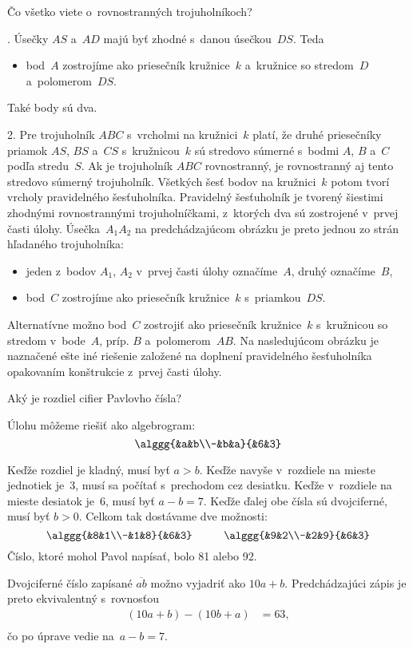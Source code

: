 {%
\napad
Čo všetko viete o~rovnostranných trojuholníkoch?

.
Úsečky $AS$ a~$AD$ majú byť zhodné s~danou úsečkou~$DS$.
Teda
\begin{itemize}
\item bod~$A$ zostrojíme ako priesečník kružnice~$k$ a~kružnice so stredom~$D$ a~polomerom~$DS$.
\end{itemize}
Také body sú dva.
%


2.
Pre trojuholník $ABC$ s~vrcholmi na kružnici~$k$ platí, že druhé priesečníky priamok $AS$, $BS$ a~$CS$ s~kružnicou~$k$ sú stredovo súmerné s~bodmi $A$, $B$ a~$C$ podľa stredu~$S$.
Ak je trojuholník $ABC$ rovnostranný, je rovnostranný aj tento stredovo súmerný trojuholník.
Všetkých šesť bodov na kružnici~$k$ potom tvorí vrcholy pravidelného šesťuholníka.
Pravidelný šesťuholník je tvorený šiestimi zhodnými rovnostrannými trojuholníčkami, z~ktorých dva sú zostrojené v~prvej časti úlohy.
Úsečka~$A_1A_2$ na predchádzajúcom obrázku je preto jednou zo strán hľadaného trojuholníka:
\begin{itemize}
\item jeden z~bodov $A_1$, $A_2$ v~prvej časti úlohy označíme~$A$,
druhý označíme~$B$,
\item bod~$C$ zostrojíme ako priesečník kružnice~$k$ s~priamkou~$DS$.
\end{itemize}

Alternatívne možno bod~$C$ zostrojiť ako priesečník kružnice~$k$ s~kružnicou so stredom v~bode~$A$, príp. $B$ a~polomerom~$AB$.
Na nasledujúcom obrázku je naznačené ešte iné riešenie založené na doplnení pravidelného šesťuholníka opakovaním konštrukcie z~prvej časti úlohy.
%

}

{%
\napad
Aký je rozdiel cifier Pavlovho čísla?

\riesenie
Úlohu môžeme riešiť ako algebrogram:
$$
\alggg{&a&b\\-&b&a}{&6&3}
$$

Keďže rozdiel je kladný, musí byť $a>b$.
Keďže navyše v~rozdiele na mieste jednotiek je~3, musí sa počítať s~prechodom cez desiatku.
Keďže v~rozdiele na mieste desiatok je~6, musí byť $a-b=7$.
Keďže ďalej obe čísla sú dvojciferné, musí byť $b>0$.
Celkom tak dostávame dve možnosti:
$$
\alggg{&8&1\\-&1&8}{&6&3}
\hskip1cm
\alggg{&9&2\\-&2&9}{&6&3}
$$
Číslo, ktoré mohol Pavol napísať, bolo 81 alebo 92.

\poznamka
Dvojciferné číslo zapísané $\overline{ab}$ možno vyjadriť ako $10a+b$.
Predchádzajúci zápis je preto ekvivalentný s~rovnosťou
$$
\begin{aligned}
(10a+b)-(10b+a)&=63,\\
\end{aligned}
$$
čo po úprave vedie na~$a-b=7$.
}

